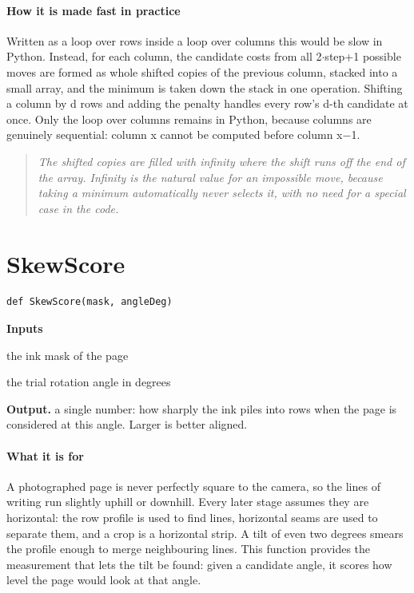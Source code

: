 \paragraph{How it is made fast in practice}
Written as a loop over rows inside a loop over columns this would be slow in Python. Instead, for each column, the candidate costs from all 2$\cdot$step+1 possible moves are formed as whole shifted copies of the previous column, stacked into a small array, and the minimum is taken down the stack in one operation. Shifting a column by d rows and adding the penalty handles every row's d-th candidate at once. Only the loop over columns remains in Python, because columns are genuinely sequential: column x cannot be computed before column x$-$1.


\begin{quote}\small\itshape The shifted copies are filled with infinity where the shift runs off the end of the array. Infinity is the natural value for an impossible move, because taking a minimum automatically never selects it, with no need for a special case in the code.\end{quote}

\section{SkewScore}
\begin{lstlisting}[style=sig]
def SkewScore(mask, angleDeg)
\end{lstlisting}

\noindent\textbf{Inputs}
\begin{description}[leftmargin=2.2em,style=nextline,font=\normalfont\ttfamily]\setlength\itemsep{1pt}
  \item[{mask}] \normalfont the ink mask of the page
  \item[{angleDeg}] \normalfont the trial rotation angle in degrees
\end{description}

\noindent\textbf{Output.} a single number: how sharply the ink piles into rows when the page is considered at this angle. Larger is better aligned.


\paragraph{What it is for}
A photographed page is never perfectly square to the camera, so the lines of writing run slightly uphill or downhill. Every later stage assumes they are horizontal: the row profile is used to find lines, horizontal seams are used to separate them, and a crop is a horizontal strip. A tilt of even two degrees smears the profile enough to merge neighbouring lines. This function provides the measurement that lets the tilt be found: given a candidate angle, it scores how level the page would look at that angle.


